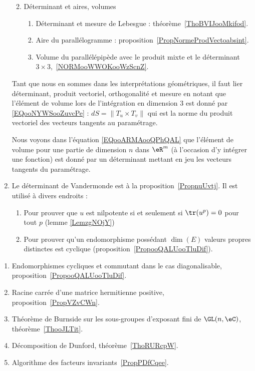 \begin{enumerate}
\begin{enumerate}
\begin{enumerate}
            \end{enumerate}
        \item
            Déterminant et aires, volumes
            \begin{enumerate}
                \item
            Déterminant et mesure de Lebesgue : théorème~\ref{ThoBVIJooMkifod}.
                \item
            Aire du parallélogramme : proposition~\ref{PropNormeProdVectoabsint}.
        \item
            Volume du parallélépipède avec le produit mixte et le déterminant \( 3\times 3\),~\ref{NORMooWWOKooWzScnZ}.
            \end{enumerate}
        \end{enumerate}
        Tant que nous en sommes dans les interprétations géométriques, il faut lier déterminant, produit vectoriel, orthogonalité et mesure en notant que l'élément de volume lors de l'intégration en dimension \( 3\) est donné par \eqref{EQooNYWSooZuvcPe} : \( dS=\| T_u\times T_v \|\) qui est la norme du produit vectoriel des vecteurs tangents au paramétrage.

        Nous voyons dans l'équation \eqref{EQooARMAooQPhQAL} que l'élément de volume pour une partie de dimension \( n\) dans \( \eR^m\) (à l'occasion d'y intégrer une fonction) est donné par un déterminant mettant en jeu les vecteurs tangents du paramétrage.
        \item
            Le déterminant de Vandermonde est à la proposition~\ref{PropnuUvtj}. Il est utilisé à divers endroits :
\begin{enumerate}
    \item
        Pour prouver que \( u\) est nilpotente si et seulement si \( \tr(u^p)=0\) pour tout \( p\) (lemme \ref{LemzgNOjY})
    \item
        Pour prouver qu'un endomorphisme possédant \( \dim(E)\) valeurs propres distinctes est cyclique (proposition~\ref{PropooQALUooTluDif}).
\end{enumerate}

   \end{enumerate}


    \begin{enumerate}
    \item Endomorphismes cycliques et commutant dans le cas diagonalisable, proposition~\ref{PropooQALUooTluDif}.
    \item Racine carrée d'une matrice hermitienne positive, proposition~\ref{PropVZvCWn}.
    \item Théorème de Burnside sur les sous-groupes d'exposant fini de \( \GL(n,\eC)\), théorème~\ref{ThooJLTit}.
    \item Décomposition de Dunford, théorème~\ref{ThoRURcpW}.
    \item Algorithme des facteurs invariants~\ref{PropPDfCqee}.
    \end{enumerate}


